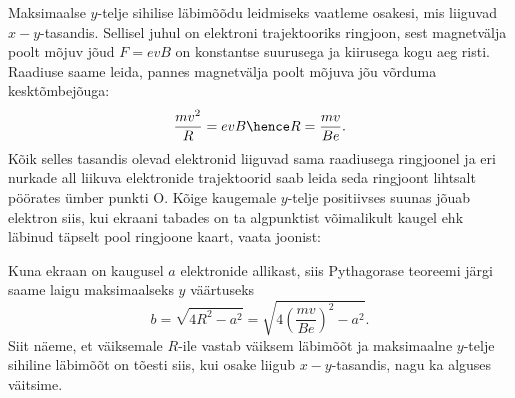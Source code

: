 \documentclass[11pt]{article}
\begin{document}
{{\ifSolution
Maksimaalse $y$-telje sihilise läbimõõdu leidmiseks vaatleme osakesi, mis liiguvad $x-y$-tasandis. Sellisel juhul on elektroni trajektooriks ringjoon, sest magnetvälja poolt mõjuv jõud $F=evB$ on konstantse suurusega ja kiirusega kogu aeg risti. Raadiuse saame leida, pannes magnetvälja poolt mõjuva jõu võrduma kesktõmbejõuga:
$$\frac{mv^2}{R}=evB \hence R = \frac{mv}{Be}.$$
Kõik selles tasandis olevad elektronid liiguvad sama raadiusega ringjoonel ja eri nurkade all liikuva elektronide trajektoorid saab leida seda ringjoont lihtsalt pöörates ümber punkti O. Kõige kaugemale $y$-telje positiivses suunas jõuab elektron siis, kui ekraani tabades on ta algpunktist võimalikult kaugel ehk läbinud täpselt pool ringjoone kaart, vaata joonist:
\begin{center}
\end{center}

Kuna ekraan on kaugusel $a$ elektronide allikast, siis Pythagorase teoreemi järgi saame laigu maksimaalseks $y$ väärtuseks $$b=\sqrt{4R^2-a^2} = \sqrt{4\left(\frac{mv}{Be}\right)^2-a^2}.$$
Siit näeme, et väiksemale $R$-ile vastab väiksem läbimõõt ja maksimaalne $y$-telje sihiline läbimõõt on tõesti siis, kui osake liigub $x-y$-tasandis, nagu ka alguses väitsime.

}}
\end{document}
